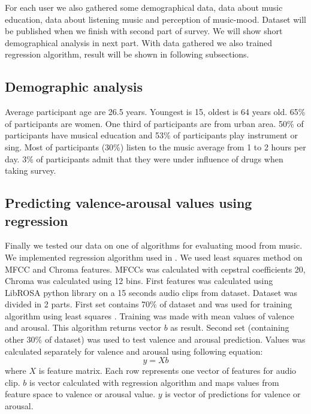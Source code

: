 \documentclass[a4paper]{article}
\begin{document}
For each user we also gathered some demographical data, data about music education, data about listening music and perception of music-mood. Dataset will be published when we finish with second part of survey. We will show short demographical analysis in next part. With  data gathered we also trained regression algorithm, result will be shown in following subsections. 

\subsection{Demographic analysis}

Average participant age are 26.5 years. Youngest is 15, oldest is 64 years old. 65\% of participants are women. One third of participants are from urban area. 50\% of participants have musical education and 53\% of participants play instrument or sing. Most of participants (30\%) listen to the music average from 1 to 2 hours per day. 3\% of participants admit that they were under influence of drugs when taking survey.

\subsection{Predicting valence-arousal values using regression}

Finally we tested our data on one of algorithms for evaluating mood from music. We implemented regression algorithm used in \cite{schmidt2009projection}. We used least squares method on MFCC \cite{logan2000mel} and Chroma \cite{bello2005robust}  features. MFCCs was calculated with cepstral coefficients 20, Chroma was calculated using 12 bins. First features was calculated using LibROSA python library on a 15 seconds audio clips from dataset. Dataset was divided in 2 parts. First set contains 70\% of dataset and was used for training algorithm using least squares \cite{abdi2007method}. Training was made with mean values of valence and arousal. This algorithm returns vector $b$ as result. Second set (containing other 30\% of dataset) was used to test valence and arousal prediction. Values was calculated separately for valence and arousal using following equation: $$y = X b$$ where $X$ is feature matrix. Each row represents one vector of features for audio clip. $b$ is vector calculated with regression algorithm and maps values from feature space to valence or arousal value. $y$ is vector of predictions for valence or arousal. 
\end{document}
